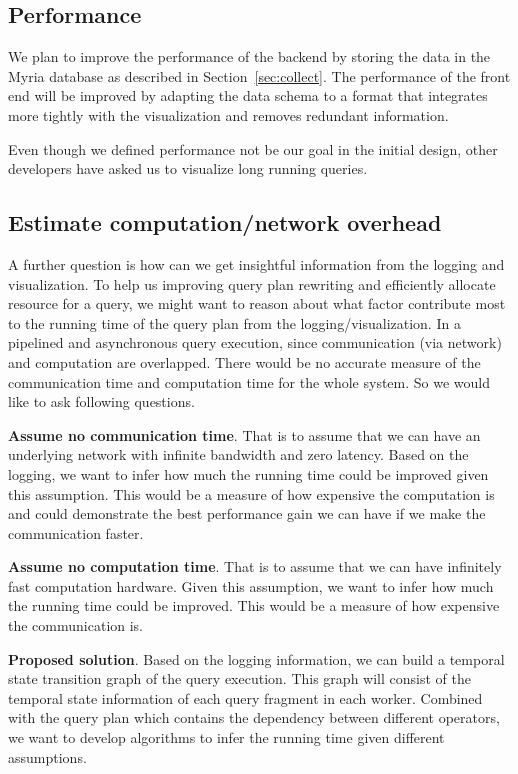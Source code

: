 \documentclass[11pt]{scrartcl}
\begin{document}
\subsection{Performance}
\label{sec:performance}

We plan to improve the performance of the backend by storing the data in the Myria database as described in Section~\ref{sec:collect}. The performance of the front end will be improved by adapting the data schema to a format that integrates more tightly with the visualization and removes redundant information.

Even though we defined performance not be our goal in the initial design, other developers have asked us to visualize long running queries.


\subsection{Estimate computation/network overhead}
\label{sec:overhead}

A further question is  how can we get insightful information from the logging and visualization. To help us improving query plan rewriting and efficiently allocate resource for a query, we might want to reason about what factor contribute most to the running time of the query plan from the logging/visualization. In a pipelined and asynchronous query execution, since communication (via network) and computation are overlapped. There would be no accurate measure of the communication time and computation time for the whole system.  So we would like to ask following questions.

\noindent\textbf{Assume no communication time}.  That is to assume that we can have an underlying network with infinite bandwidth and zero latency. Based on the logging, we want to infer how much the running time could be improved given this assumption. This would be a measure of how expensive the computation is and could demonstrate the best performance gain we can have if we make the communication faster.

\noindent\textbf{Assume no computation time}.  That is to assume that we can have infinitely fast computation hardware. Given this assumption, we want to infer how much the running time could be improved. This would be a measure of how expensive the communication is.

\noindent\textbf{Proposed solution}.  Based on the logging information, we can build a temporal state transition graph of the query execution. This graph will consist of the temporal state information of each query fragment in each worker. Combined with the query plan which contains the dependency between different operators, we want to develop algorithms to infer the running time given different assumptions.



\end{document}
